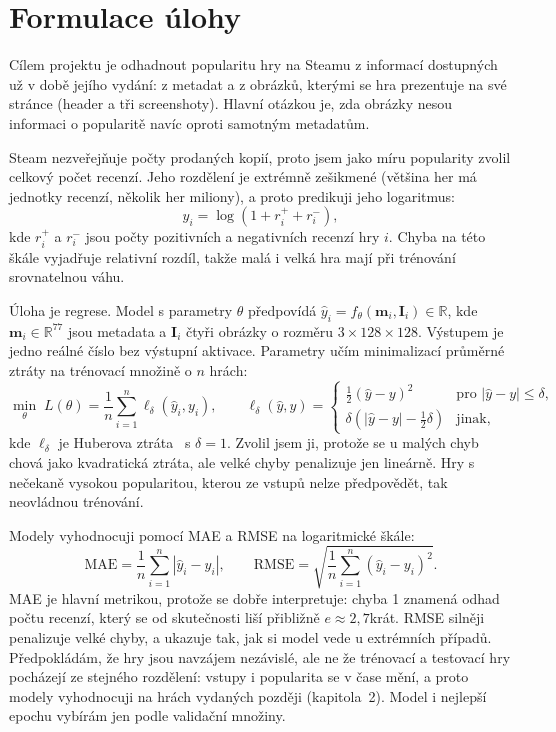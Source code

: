 \section{Formulace úlohy}

Cílem projektu je odhadnout popularitu hry na Steamu z informací dostupných už v době jejího
vydání: z metadat a z obrázků, kterými se hra prezentuje na své stránce (header a tři screenshoty).
Hlavní otázkou je, zda obrázky nesou informaci o popularitě navíc oproti samotným metadatům.

Steam nezveřejňuje počty prodaných kopií, proto jsem jako míru popularity zvolil celkový počet
recenzí. Jeho rozdělení je extrémně zešikmené (většina her má jednotky recenzí, několik her
miliony), a proto predikuji jeho logaritmus:
\begin{equation}
    y_i = \log\left(1 + r_i^{+} + r_i^{-}\right),
\end{equation}
kde $r_i^{+}$ a $r_i^{-}$ jsou počty pozitivních a negativních recenzí hry $i$. Chyba na této
škále vyjadřuje relativní rozdíl, takže malá i velká hra mají při trénování srovnatelnou váhu.

Úloha je regrese. Model s parametry $\theta$ předpovídá
$\hat{y}_i = f_\theta(\mathbf{m}_i, \mathbf{I}_i) \in \mathbb{R}$, kde $\mathbf{m}_i \in \mathbb{R}^{77}$
jsou metadata a $\mathbf{I}_i$ čtyři obrázky o rozměru $3 \times 128 \times 128$. Výstupem je
jedno reálné číslo bez výstupní aktivace. Parametry učím minimalizací průměrné ztráty
na trénovací množině o $n$ hrách:
\begin{equation}
    \min_\theta \; L(\theta) = \frac{1}{n} \sum_{i=1}^{n} \ell_\delta\left(\hat{y}_i, y_i\right), \qquad
    \ell_\delta(\hat{y}, y) =
    \begin{cases}
        \frac{1}{2}(\hat{y} - y)^2 & \text{pro } |\hat{y} - y| \le \delta, \\
        \delta \left(|\hat{y} - y| - \frac{1}{2}\delta\right) & \text{jinak,}
    \end{cases}
\end{equation}
kde $\ell_\delta$ je Huberova ztráta~\cite{huber1964} s $\delta = 1$. Zvolil jsem ji, protože se
u malých chyb chová jako kvadratická ztráta, ale velké chyby penalizuje jen lineárně. Hry
s nečekaně vysokou popularitou, kterou ze vstupů nelze předpovědět, tak neovládnou trénování.

Modely vyhodnocuji pomocí MAE a RMSE na logaritmické škále:
\begin{equation}
    \mathrm{MAE} = \frac{1}{n} \sum_{i=1}^{n} \left| \hat{y}_i - y_i \right|, \qquad
    \mathrm{RMSE} = \sqrt{\frac{1}{n} \sum_{i=1}^{n} \left( \hat{y}_i - y_i \right)^2}.
\end{equation}
MAE je hlavní metrikou, protože
se dobře interpretuje: chyba 1 znamená odhad počtu recenzí, který se od skutečnosti liší
přibližně $e \approx 2{,}7$krát. RMSE silněji penalizuje velké chyby, a ukazuje tak, jak si model
vede u extrémních případů. Předpokládám, že hry jsou navzájem nezávislé, ale ne že trénovací a testovací
hry pocházejí ze stejného rozdělení: vstupy i popularita se v čase mění, a proto modely
vyhodnocuji na hrách vydaných později (kapitola~2). Model i nejlepší epochu vybírám jen podle
validační množiny.